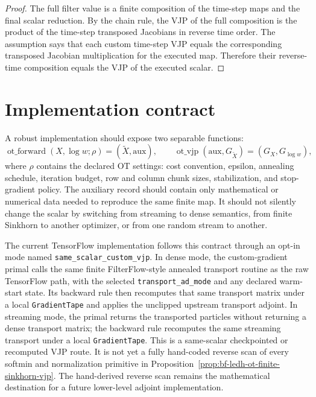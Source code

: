 \begin{proof}
The full filter value is a finite composition of the time-step maps and the
final scalar reduction.  By the chain rule, the VJP of the full composition is
the product of the time-step transposed Jacobians in reverse time order.  The
assumption says that each custom time-step VJP equals the corresponding
transposed Jacobian multiplication for the executed map.  Therefore their
reverse-time composition equals the VJP of the executed scalar.
\end{proof}

\section{Implementation contract}
\label{sec:bf-ledh-ot-implementation-contract}

A robust implementation should expose two separable functions:
\[
  \operatorname{ot\_forward}(X,\log w;\rho)
  =
  (\widetilde X,\mathrm{aux}),
  \qquad
  \operatorname{ot\_vjp}(\mathrm{aux},G_{\widetilde X})
  =
  (G_X,G_{\log w}),
\]
where \(\rho\) contains the declared OT settings: cost convention, epsilon,
annealing schedule, iteration budget, row and column chunk sizes, stabilization,
and stop-gradient policy.  The auxiliary record should contain only mathematical
or numerical data needed to reproduce the same finite map.  It should not
silently change the scalar by switching from streaming to dense semantics, from
finite Sinkhorn to another optimizer, or from one random stream to another.

The current TensorFlow implementation follows this contract through an
opt-in mode named \texttt{same\_scalar\_custom\_vjp}.  In dense mode, the
custom-gradient primal calls the same finite FilterFlow-style annealed
transport routine as the raw TensorFlow path, with the selected
\texttt{transport\_ad\_mode} and any declared warm-start state.  Its backward
rule then recomputes that same transport matrix under a local
\texttt{GradientTape} and applies the unclipped upstream transport adjoint.  In
streaming mode, the primal returns the transported particles without returning
a dense transport matrix; the backward rule recomputes the same streaming
transport under a local \texttt{GradientTape}.  This is a same-scalar
checkpointed or recomputed VJP route.  It is not yet a fully hand-coded
reverse scan of every softmin and normalization primitive in
Proposition~\ref{prop:bf-ledh-ot-finite-sinkhorn-vjp}.  The hand-derived
reverse scan remains the mathematical destination for a future lower-level
adjoint implementation.

